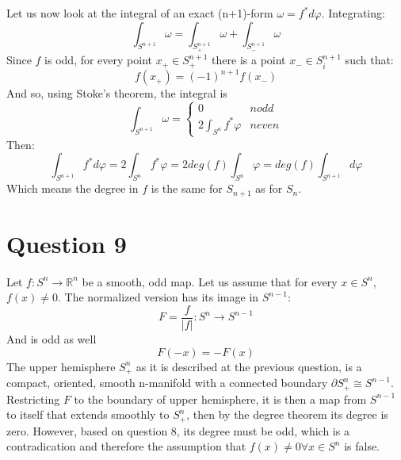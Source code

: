 \documentclass{article}
\newcommand{\R}{\ensuremath{\mathbb{R}}}
\begin{document}
Let us now look at the integral of an exact (n+1)-form $\omega = f^* d\varphi$. Integrating:
\begin{equation}
    \int_{S^{n+1}} \omega = 
    \int_{S^{n+1}_{+}} \omega +
    \int_{S^{n+1}_{-}} \omega
\end{equation}
Since $f$ is odd, for every point $x_{+} \in S^{n+1}_{+}$ there is a point $x_{-} \in S^{n+1}_{i}$ such that:
\begin{equation}
    f(x_{+}) = (-1)^{n+1}f(x_{-})
\end{equation}
And so, using Stoke's theorem, the integral is
\begin{equation}
    \int_{S^{n+1}} \omega = \begin{cases}
        0 & n odd
        \\
        2\int_{S^{n}} f^* \varphi & n even
    \end{cases}
\end{equation}
Then:
\begin{equation}
    \int_{S^{n+1}} f^* d\varphi = 
    2\int_{S^{n}} f^* \varphi = 
    2deg(f)\int_{S^{n}} \varphi = 
    deg(f)\int_{S^{n+1}} d\varphi
\end{equation}
Which means the degree in $f$ is the same for $S_{n+1}$ as for $S_n$.

\section*{Question 9}
Let $f: S^n \rightarrow \R^n$ be a smooth, odd map. Let us assume that for every $x \in S^n$, $f(x) \ne 0$. The normalized version has its image in $S^{n-1}$:
\begin{equation}
    F = \frac{f}{\left|f\right|}: S^n \rightarrow S^{n-1}
\end{equation}
And is odd as well
\begin{equation}
    F(-x) = -F(x)
\end{equation}
The upper hemisphere $S^{n}_{+}$ as it is described at the previous question, is a compact, oriented, smooth n-manifold with a connected boundary $\partial S^{n}_{+} \cong S^{n-1}$. Restricting $F$ to the boundary of upper hemisphere, it is then a map from $S^{n-1}$ to itself that extends smoothly to $S^{n}_{+}$, then by the degree theorem its degree is zero.
However, based on question 8, its degree must be odd, which is a contradication and therefore the assumption that $f(x) \ne 0 \forall x \in S^n$ is false.
\end{document}
